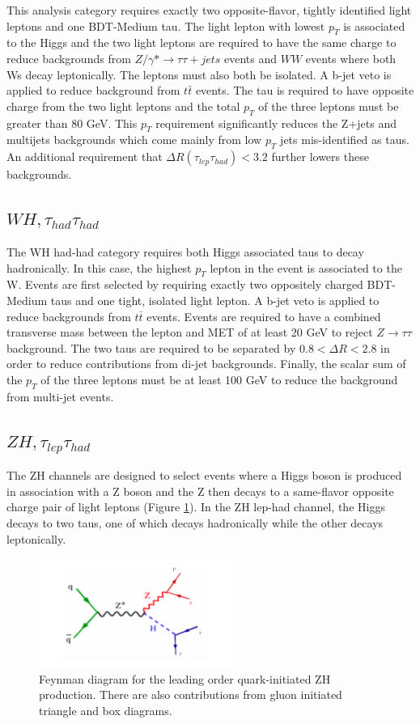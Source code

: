 This analysis category requires exactly two opposite-flavor, tightly identified light leptons and one BDT-Medium tau. The light lepton with lowest $p_T$ is associated to the Higgs and the two light leptons are required to have the same charge to reduce backgrounds from $Z/\gamma*\rightarrow\tau\tau+jets$ events and $WW$ events where both Ws decay leptonically. The leptons must also both be isolated. A b-jet veto is applied to reduce background from $t\bar{t}$ events. The tau is required to have opposite charge from the two light leptons and the total $p_T$ of the three leptons must be greater than 80 GeV. This $p_T$ requirement significantly reduces the Z+jets and multijets backgrounds which come mainly from low $p_T$ jets mis-identified as taus. An additional requirement that $\Delta R(\tau_{lep}\tau_{had})<3.2$ further lowers these backgrounds. 

\subsection{$WH, \tau_{had}\tau_{had}$}
The WH had-had category requires both Higgs associated taus to decay hadronically. In this case, the highest $p_T$ lepton in the event is associated to the W. Events are first selected by requiring exactly two oppositely charged BDT-Medium taus and one tight, isolated light lepton. A b-jet veto is applied to reduce backgrounds from $t\bar{t}$ events. Events are required to have a combined transverse mass between the lepton and MET of at least 20 GeV to reject $Z\rightarrow\tau\tau$ background. The two taus are required to be separated by $0.8<\Delta R<2.8$ in order to reduce contributions from di-jet backgrounds. Finally, the scalar sum of the $p_T$ of the three leptons must be at least 100 GeV to reduce the background from multi-jet events.

\subsection{$ZH, \tau_{lep}\tau_{had}$}
The ZH channels are designed to select events where a Higgs boson is produced in association with a Z boson and the Z then decays to a same-flavor opposite charge pair of light leptons (Figure \ref{fig:zh_feyn}). In the ZH lep-had channel, the Higgs decays to two taus, one of which decays hadronically while the other decays leptonically.\\

\begin{figure}[htb!]
    \centering
    \includegraphics[width=2.5in]{figures/chapter6/zh_feynman.pdf}
    \caption{Feynman diagram for the leading order quark-initiated ZH production. There are also contributions from gluon initiated triangle and box diagrams.}
    \label{fig:zh_feyn}
\end{figure}

